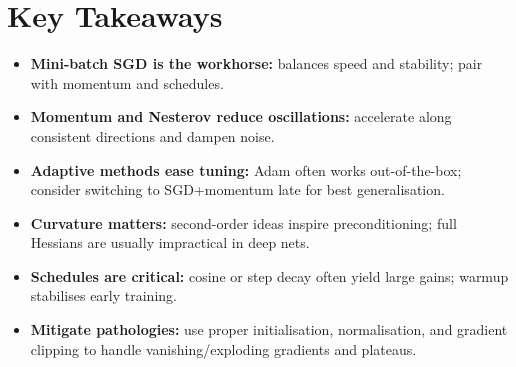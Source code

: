 
\section{Key Takeaways }
\label{sec:ch8-key-takeaways}

\begin{keytakeaways}
\begin{itemize}
    \item \textbf{Mini-batch SGD is the workhorse:} balances speed and stability; pair with momentum and schedules.
    \item \textbf{Momentum and Nesterov reduce oscillations:} accelerate along consistent directions and dampen noise.
    \item \textbf{Adaptive methods ease tuning:} Adam often works out-of-the-box; consider switching to SGD+momentum late for best generalisation.
    \item \textbf{Curvature matters:} second-order ideas inspire preconditioning; full Hessians are usually impractical in deep nets.
    \item \textbf{Schedules are critical:} cosine or step decay often yield large gains; warmup stabilises early training.
    \item \textbf{Mitigate pathologies:} use proper initialisation, normalisation, and gradient clipping to handle vanishing/exploding gradients and plateaus.
\end{itemize}
\end{keytakeaways}



